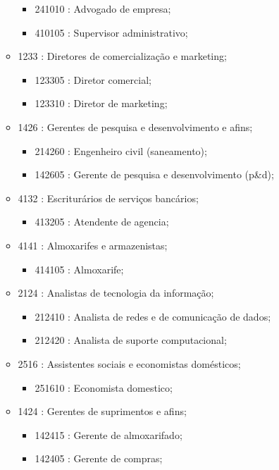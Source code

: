 \begin{itemize}
\begin{itemize}
\begin{itemize}
      \item 241010 : Advogado de empresa;
      \item 410105 : Supervisor administrativo;
    \end{itemize}
    \item 1233 : Diretores de comercialização e marketing;
    \begin{itemize}
      \item 123305 : Diretor comercial;
      \item 123310 : Diretor de marketing;
    \end{itemize}
    \item 1426 : Gerentes de pesquisa e desenvolvimento e afins;
    \begin{itemize}
      \item 214260 : Engenheiro civil (saneamento);
      \item 142605 : Gerente de pesquisa e desenvolvimento (p\&d);
    \end{itemize}
    \item 4132 : Escriturários de serviços bancários;
    \begin{itemize}
      \item 413205 : Atendente de agencia;
    \end{itemize}
    \item 4141 : Almoxarifes e armazenistas;
    \begin{itemize}
      \item 414105 : Almoxarife;
    \end{itemize}
    \item 2124 : Analistas de tecnologia da informação;
    \begin{itemize}
      \item 212410 : Analista de redes e de comunicação de dados;
      \item 212420 : Analista de suporte computacional;
    \end{itemize}
    \item 2516 : Assistentes sociais e economistas domésticos;
    \begin{itemize}
      \item 251610 : Economista domestico;
    \end{itemize}
    \item 1424 : Gerentes de suprimentos e afins;
    \begin{itemize}
      \item 142415 : Gerente de almoxarifado;
      \item 142405 : Gerente de compras;

\end{itemize}
\end{itemize}
\end{itemize}
